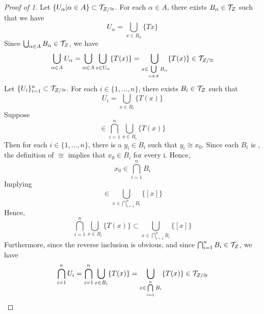\begin{prop}
\begin{proof}[Proof of 1]
        Let $\{U_{\alpha} | \alpha \in A\} \subset \mathcal{T}_{Z/\cong}$. 
        For each $\alpha \in A$, there exists $B_{\alpha} \in \mathcal{T}_{Z}$ such that we have
        \begin{equation} 
            U_{\alpha } = \bigcup_{x \in B_{\alpha}} \{Tx\}
        \end{equation} 
        Since $\bigcup_{\alpha \in A} B_\alpha \in \mathcal{T}_{Z}$, we have 
        \begin{equation}
            \bigcup_{\alpha \in A} U_{\alpha}= \bigcup\limits_{\alpha \in A} \bigcup\limits_{x \in U_\alpha} \{T(x)\} = \bigcup\limits_{x \in \bigcup\limits_{\alpha \in A} B_{\alpha}} \{T(x)\} \in \mathcal{T}_{Z/\cong}
        \end{equation} 
        Let $\{U_i\}_{i=1}^n \subset \mathcal{T}_{Z/\cong}$. 
        For each $i \in \{1, ..., n\}$, there exists $B_i \in \mathcal{T}_{Z}$ such that
        \begin{equation}
            U_i = \bigcup_{x \in B_{i}} \{T(x)\}
        \end{equation}
        Suppose 
        \begin{equation}
            [x_0] \in \bigcap\limits_{i=1}^n \bigcup\limits_{x \in B_i} \{T(x)\}
        \end{equation}
        Then for each $i \in \{1,..., n\}$, there is a $y_i \in B_i$ such that $ y_i \cong x_0$. 
        Since each $B_i$ is \SetOpen, the definition of $\cong$ implies that $x_0 \in B_i$ for every i. Hence, 
        \begin{equation} 
            x_0 \in \bigcap_{i=1}^n B_i
        \end{equation} 
        Implying 
        \begin{equation}
            [x_0] \in  \bigcup\limits_{x \in \bigcap\limits_{i=1}^n B_i} \{[x]\}
        \end{equation} 
        Hence, 
        \begin{equation} 
            \bigcap\limits_{i=1}^n \bigcup\limits_{x \in B_i} \{T(x)\}
            \subset
            \bigcup\limits_{x \in \bigcap\limits_{i=1}^n B_i} \{[x]\}
        \end{equation} 
        Furthermore, since the reverse inclusion is obvious, 
        and since $\bigcap_{i=1}^n B_i \in \mathcal{T}_{Z}$, we have 
        \begin{equation}
            \bigcap_{i=1}^n U_i = \bigcap_{i=1}^n \bigcup_{x \in B_i} \{T(x)\}= \bigcup\limits_{x \in \bigcap\limits_{i=1}^n B_i} \{T(x)\} \in \mathcal{T}_{Z/\cong}
        \end{equation}

\end{proof}
\end{prop}
